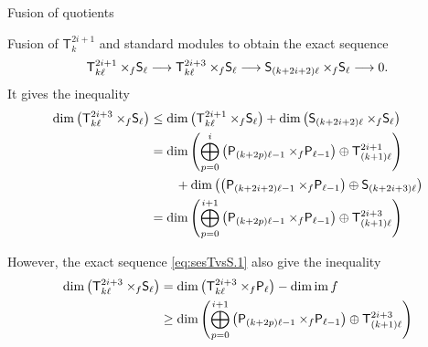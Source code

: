 \documentclass[reqno]{amsart}
\newcommand{\ds}[1]{\mathsf S_{#1}}
\newcommand{\dP}[1]{\mathsf P_{#1}}
\newcommand{\xf}{\times\hspace{-0.27em}_f}
\newcommand{\T}[2]{\mathsf{T}^{#1}_{#2}}
\newcommand{\lc}{\ell}
\DeclareMathOperator{\im}{im}
\begin{document}
\begin{section}{Fusion of quotients}
\begin{subsection}{Fusion of $\T{2i+1}{k}$ and standard modules}
to obtain the exact sequence
\begin{equation}
\T{2i+1}{k\lc}\xf \ds{\lc} \longrightarrow \T{2i+3}{k\lc}\xf \ds{\lc} \longrightarrow \ds{(k+2i+2)\lc}\xf \ds{\lc} \longrightarrow 0.
\end{equation}
It gives the inequality
\begin{align*}
	\dim \left(\T{2i+3}{k\lc}\xf \ds{\lc} \right) & \leq \dim \left(\T{2i+1}{k\lc}\xf \ds{\lc} \right) + \dim \left( \ds{(k+2i+2)\lc}\xf \ds{\lc} \right)\\
	&= \dim \left( \overset{i}{\underset{p=0}{\bigoplus}}\left( \dP{(k+2p)\lc-1} \xf \dP{\lc-1}\right) \oplus \T{2i+1}{(k+1)\lc}\right)\\
	& \qquad + \dim \left(\left( \dP{(k+2i+2)\lc-1} \xf \dP{\lc-1}\right) \oplus \ds{(k+2i + 3)\lc} \right)\\
	& = \dim \left(\overset{i+1}{\underset{p=0}{\bigoplus}}\left( \dP{(k+2p)\lc-1} \xf \dP{\lc-1}\right) \oplus \T{2i+3}{(k+1)\lc} \right)
\end{align*}
 
However, the exact sequence \eqref{eq:sesTvsS.1} also give the inequality
\begin{align*}
\dim \left( \T{2i+3}{k\lc}\xf \ds{\lc}\right) & = \dim \left(\T{2i+3}{k\lc}\xf\dP{\lc} \right) - \dim \im f \\
& \geq \dim \left( \overset{i+1}{\underset{p=0}{\bigoplus}}\left( \dP{(k+2p)\lc-1} \xf \dP{\lc-1}\right) \oplus \T{2i+3}{(k+1)\lc} \right)
\end{align*}


\end{subsection}
\end{section}
\end{document}
